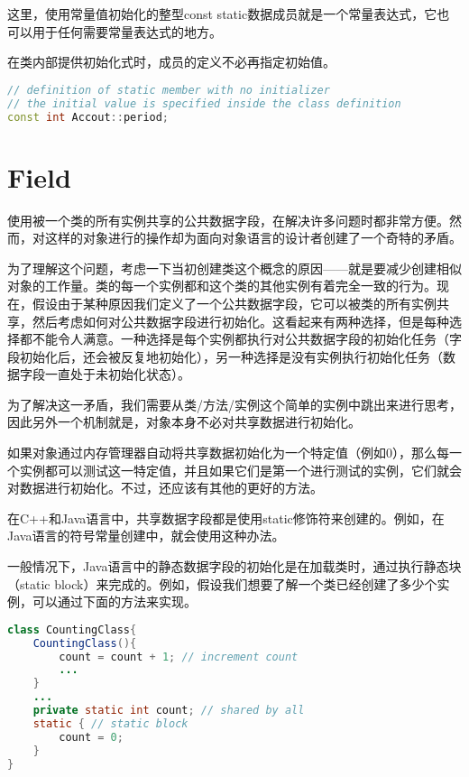 这里，使用常量值初始化的整型const static数据成员就是一个常量表达式，它也可以用于任何需要常量表达式的地方。


在类内部提供初始化式时，成员的定义不必再指定初始值。

\begin{lstlisting}[language=C++]
// definition of static member with no initializer
// the initial value is specified inside the class definition
const int Accout::period;
\end{lstlisting}



\chapter{Field}

使用被一个类的所有实例共享的公共数据字段，在解决许多问题时都非常方便。然而，对这样的对象进行的操作却为面向对象语言的设计者创建了一个奇特的矛盾。

为了理解这个问题，考虑一下当初创建类这个概念的原因——就是要减少创建相似对象的工作量。类的每一个实例都和这个类的其他实例有着完全一致的行为。现在，假设由于某种原因我们定义了一个公共数据字段，它可以被类的所有实例共享，然后考虑如何对公共数据字段进行初始化。这看起来有两种选择，但是每种选择都不能令人满意。一种选择是每个实例都执行对公共数据字段的初始化任务（字段初始化后，还会被反复地初始化），另一种选择是没有实例执行初始化任务（数据字段一直处于未初始化状态）。

为了解决这一矛盾，我们需要从类/方法/实例这个简单的实例中跳出来进行思考，因此另外一个机制就是，对象本身不必对共享数据进行初始化。

如果对象通过内存管理器自动将共享数据初始化为一个特定值（例如0），那么每一个实例都可以测试这一特定值，并且如果它们是第一个进行测试的实例，它们就会对数据进行初始化。不过，还应该有其他的更好的方法。

在C++和Java语言中，共享数据字段都是使用static修饰符来创建的。例如，在Java语言的符号常量创建中，就会使用这种办法。

一般情况下，Java语言中的静态数据字段的初始化是在加载类时，通过执行静态块（static block）来完成的。例如，假设我们想要了解一个类已经创建了多少个实例，可以通过下面的方法来实现。

\begin{lstlisting}[language=Java]
class CountingClass{
	CountingClass(){
		count = count + 1; // increment count
		...
	}
	...
	private static int count; // shared by all
	static { // static block
		count = 0;
	}
}
\end{lstlisting}

